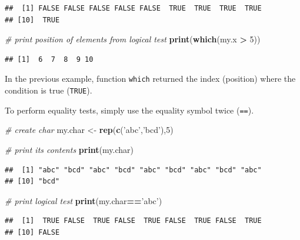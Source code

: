 \documentclass[11pt,]{book}
\newenvironment{Shaded}{\begin{snugshade}}{\end{snugshade}}
\newcommand{\KeywordTok}[1]{\textcolor[rgb]{0.27,0.27,0.27}{\textbf{#1}}}
\newcommand{\DecValTok}[1]{\textcolor[rgb]{0.06,0.06,0.06}{#1}}
\newcommand{\StringTok}[1]{\textcolor[rgb]{0.5,0.5,0.5}{#1}}
\newcommand{\CommentTok}[1]{\textcolor[rgb]{0.56,0.35,0.01}{\textit{#1}}}
\newcommand{\OperatorTok}[1]{\textcolor[rgb]{0.81,0.36,0.00}{\textbf{#1}}}
\newcommand{\NormalTok}[1]{#1}
\begin{document}
\begin{verbatim}
##  [1] FALSE FALSE FALSE FALSE FALSE  TRUE  TRUE  TRUE  TRUE
## [10]  TRUE
\end{verbatim}

\begin{Shaded}
\begin{Highlighting}[]
\CommentTok{# print position of elements from logical test}
\KeywordTok{print}\NormalTok{(}\KeywordTok{which}\NormalTok{(my.x }\OperatorTok{>}\StringTok{ }\DecValTok{5}\NormalTok{))}
\end{Highlighting}
\end{Shaded}

\begin{verbatim}
## [1]  6  7  8  9 10
\end{verbatim}

In the previous example, function \texttt{which} returned the index
(position) where the condition is true (\texttt{TRUE}).

To perform equality tests, simply use the equality symbol twice
(\texttt{==}). 

\begin{Shaded}
\begin{Highlighting}[]
\CommentTok{# create char}
\NormalTok{my.char <-}\StringTok{ }\KeywordTok{rep}\NormalTok{(}\KeywordTok{c}\NormalTok{(}\StringTok{'abc'}\NormalTok{,}\StringTok{'bcd'}\NormalTok{),}\DecValTok{5}\NormalTok{)}

\CommentTok{# print its contents}
\KeywordTok{print}\NormalTok{(my.char)}
\end{Highlighting}
\end{Shaded}

\begin{verbatim}
##  [1] "abc" "bcd" "abc" "bcd" "abc" "bcd" "abc" "bcd" "abc"
## [10] "bcd"
\end{verbatim}

\begin{Shaded}
\begin{Highlighting}[]
\CommentTok{# print logical test}
\KeywordTok{print}\NormalTok{(my.char}\OperatorTok{==}\StringTok{'abc'}\NormalTok{)}
\end{Highlighting}
\end{Shaded}

\begin{verbatim}
##  [1]  TRUE FALSE  TRUE FALSE  TRUE FALSE  TRUE FALSE  TRUE
## [10] FALSE
\end{verbatim}
\end{document}
